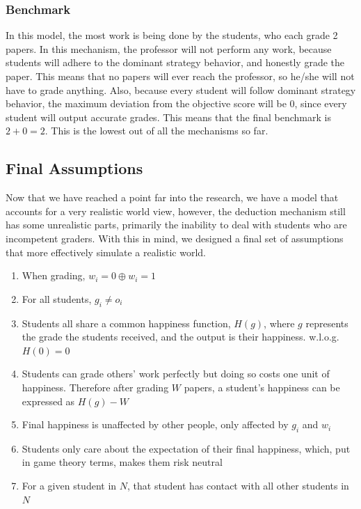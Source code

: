 \documentclass[12pt, Arial]{article}
\begin{document}
\subsubsection{Benchmark}
In this model, the most work is being done by the students, who each grade 2 papers. In this mechanism, the professor will not perform any work, because students will adhere to the dominant strategy behavior, and honestly grade the paper. This means that no papers will ever reach the professor, so he/she will not have to grade anything. Also, because every student will follow dominant strategy behavior, the maximum deviation from the objective score will be 0, since every student will output accurate grades. This means that the final benchmark is $2+0=2$. This is the lowest out of all the mechanisms so far.
\subsection{Final Assumptions}
Now that we have reached a point far into the research, we have a model that accounts for a very realistic world view, however, the deduction mechanism still has some unrealistic parts, primarily the inability to deal with students who are incompetent graders. With this in mind, we designed a final set of assumptions that more effectively simulate a realistic world.

\begin{enumerate}[itemsep=0pt, parsep=0pt]
\item When grading, $w_i=0 \oplus w_i=1$
\item For all students, $g_i \neq o_i$
\item Students all share a common happiness function, $H(g)$, where $g$ represents the grade the students received, and the output is their happiness. w.l.o.g. $H(0)=0$
\item Students can grade others' work perfectly but doing so costs one unit of happiness. Therefore after grading $W$ papers, a student's happiness can be expressed as $H(g)-W$
\item Final happiness is unaffected by other people, only affected by $g_i$ and $w_i$
\item Students only care about the expectation of their final happiness, which, put in game theory terms, makes them risk neutral
\item For a given student in $N$, that student has contact with all other students in $N$
\end{enumerate}
\newpage
\end{document}
